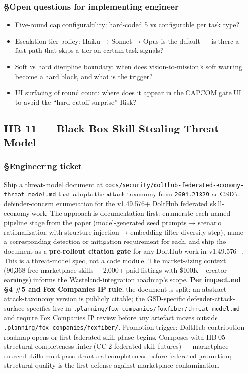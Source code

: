 \documentclass[11pt,letterpaper]{article}
\newcommand{\arxivid}[1]{\texttt{\textcolor{accent}{#1}}}
\providecommand{\tightlist}{\setlength{\itemsep}{0pt}\setlength{\parskip}{0pt}}
\begin{document}
\subsubsection{§Open questions for implementing
engineer}

\begin{itemize}
\tightlist
\item
  Five-round cap configurability: hard-coded 5 vs configurable per task
  type?
\item
  Escalation tier policy: Haiku → Sonnet → Opus is the default --- is
  there a fast path that skips a tier on certain task signals?
\item
  Soft vs hard discipline boundary: when does vision-to-mission's soft
  warning become a hard block, and what is the trigger?
\item
  UI surfacing of round count: where does it appear in the CAPCOM gate
  UI to avoid the ``hard cutoff surprise'' Risk?
\end{itemize}


\subsection{HB-11 — Black-Box Skill-Stealing Threat Model}
\subsubsection{§Engineering ticket}

Ship a threat-model document at
\texttt{docs/security/dolthub-federated-economy-threat-model.md} that
adopts the attack taxonomy from \arxivid{2604.21829} as GSD's
defender-concern enumeration for the v1.49.576+ DoltHub federated
skill-economy work. The approach is documentation-first: enumerate each
named pipeline stage from the paper (model-generated seed prompts →
scenario rationalization with structure injection → embedding-filter
diversity step), name a corresponding detection or mitigation
requirement for each, and ship the document as a \textbf{pre-rollout
citation gate} for any DoltHub work in v1.49.576+. This is a
threat-model spec, not a code module. The market-sizing context (90,368
free-marketplace skills + 2,000+ paid listings with \$100K+ creator
earnings) informs the Wasteland-integration roadmap's scope. \textbf{Per
impact.md §4 \#5 and Fox Companies IP rule}, the document is split: an
abstract attack-taxonomy version is publicly citable; the GSD-specific
defender-attack-surface specifics live in
\texttt{.planning/fox-companies/foxfiber/threat-model.md} and require
Fox Companies IP review before any artefact moves outside
\texttt{.planning/fox-companies/foxfiber/}. Promotion trigger: DoltHub
contribution roadmap opens or first federated-skill phase begins.
Composes with HB-05 structural-completeness linter (CC-2 federated-skill
futures) --- marketplace-sourced skills must pass structural
completeness before federated promotion; structural quality is the first
defense against marketplace contamination.
\end{document}
